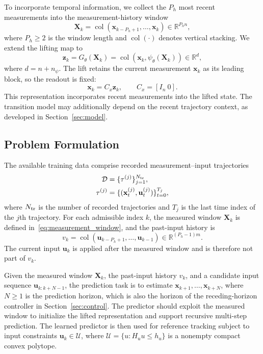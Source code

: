 \documentclass[journal]{IEEEtran}
\theoremstyle{plain}
\theoremstyle{definition}
\newcommand{\vx}{\mathbf{x}}
\newcommand{\vu}{\mathbf{u}}
\newcommand{\vz}{\mathbf{z}}
\newcommand{\mX}{\mathbf{X}}
\newcommand{\R}{\mathbb{R}}
\newcommand{\col}{\operatorname{col}}
\begin{document}
To incorporate temporal information, we collect the $P_h$ most recent measurements into the measurement-history window
\begin{equation}
\mX_k=\col(\vx_{k-P_h+1},\ldots,\vx_k)\in\R^{P_h n},
\label{eq:measurement_window}
\end{equation}
where $P_h\ge2$ is the window length and $\col(\cdot)$ denotes vertical stacking. We extend the lifting map to
\begin{equation}
\vz_k=G_\theta(\mX_k)=\col(\vx_k,\psi_\theta(\mX_k))\in\R^d,
\label{eq:state_preserving_lifting}
\end{equation}
where $d=n+n_\psi$. The lift retains the current measurement $\vx_k$ as its leading block, so the readout is fixed:
\begin{equation}
\vx_k=C_x\vz_k,\qquad C_x=[I_n\ 0].
\label{eq:state_readout}
\end{equation}
This representation incorporates recent measurements into the lifted state. The transition model may additionally depend on the recent trajectory context, as developed in Section~\ref{sec:model}.

\subsection{Problem Formulation}
\label{sec:problem}
The available training data comprise recorded measurement--input trajectories
\begin{equation}
\begin{aligned}
\mathcal D &= \{\tau^{(j)}\}_{j=1}^{N_{\rm tr}},\\
\tau^{(j)} &= \{(\vx_t^{(j)},\vu_t^{(j)})\}_{t=0}^{T_j},
\end{aligned}
\label{eq:training_data}
\end{equation}
where $N_{\rm tr}$ is the number of recorded trajectories and $T_j$ is the last time index of the $j$th trajectory.
For each admissible index $k$, the measured window $\mX_k$ is defined in~\eqref{eq:measurement_window}, and the past-input history is
\begin{equation}
v_k = \col(\vu_{k-P_h+1},\ldots,\vu_{k-1}) \in \R^{(P_h-1)m}.
\label{eq:past_input_history}
\end{equation}
The current input $\vu_k$ is applied after the measured window and is therefore not part of $v_k$.

Given the measured window $\mX_k$, the past-input history $v_k$, and a candidate input sequence $\vu_{k:k+N-1}$, the prediction task is to estimate $\vx_{k+1},\ldots,\vx_{k+N}$, where $N\ge1$ is the prediction horizon, which is also the horizon of the receding-horizon controller in Section~\ref{sec:control}. The predictor should exploit the measured window to initialize the lifted representation and support recursive multi-step prediction. The learned predictor is then used for reference tracking subject to input constraints $\vu_k\in\mathcal U$, where $\mathcal U=\{u:H_uu\leq h_u\}$ is a nonempty compact convex polytope.
\end{document}
